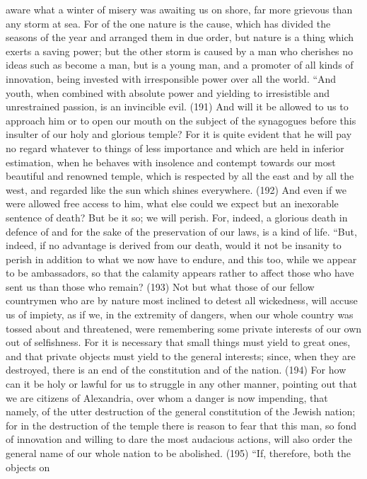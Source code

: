 aware what a winter of misery was awaiting us on shore, far more grievous than any storm at sea.
For of the one nature is the cause, which has divided the seasons of the year and arranged them
in due order, but nature is a thing which exerts a saving power; but the other storm is caused by a
man who cherishes no ideas such as become a man, but is a young man, and a promoter of all
kinds of innovation, being invested with irresponsible power over all the world. ``And youth, when
combined with absolute power and yielding to irresistible and unrestrained passion, is an invincible
evil. (191) And will it be allowed to us to approach him or to open our mouth on the subject of the
synagogues before this insulter of our holy and glorious temple? For it is quite evident that he will
pay no regard whatever to things of less importance and which are held in inferior estimation, when
he behaves with insolence and contempt towards our most beautiful and renowned temple, which is
respected by all the east and by all the west, and regarded like the sun which shines everywhere.
(192) And even if we were allowed free access to him, what else could we expect but an inexorable
sentence of death? But be it so; we will perish. For, indeed, a glorious death in defence of and for
the sake of the preservation of our laws, is a kind of life. ``But, indeed, if no advantage is derived
from our death, would it not be insanity to perish in addition to what we now have to endure, and
this too, while we appear to be ambassadors, so that the calamity appears rather to affect those
who have sent us than those who remain? (193) Not but what those of our fellow countrymen who
are by nature most inclined to detest all wickedness, will accuse us of impiety, as if we, in the
extremity of dangers, when our whole country was tossed about and threatened, were
remembering some private interests of our own out of selfishness. For it is necessary that small
things must yield to great ones, and that private objects must yield to the general interests; since,
when they are destroyed, there is an end of the constitution and of the nation. (194) For how can it
be holy or lawful for us to struggle in any other manner, pointing out that we are citizens of
Alexandria, over whom a danger is now impending, that namely, of the utter destruction of the
general constitution of the Jewish nation; for in the destruction of the temple there is reason to fear
that this man, so fond of innovation and willing to dare the most audacious actions, will also order
the general name of our whole nation to be abolished. (195) ``If, therefore, both the objects on
